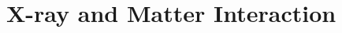 \subtitle{X-Ray - Part 2}
\frame[plain,c]{\titlepage} %



\section{X-ray and Matter Interaction}



